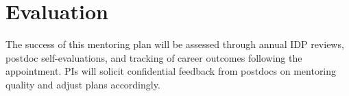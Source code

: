\documentclass[11pt]{article}
\begin{document}
\section*{Evaluation} The success of this mentoring plan will be assessed through annual IDP
reviews, postdoc self-evaluations, and tracking of career outcomes following
the appointment. PIs will solicit confidential feedback from postdocs on
mentoring quality and adjust plans accordingly.
\end{document}
